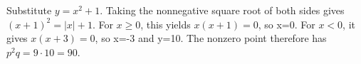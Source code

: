 Substitute $y=x^2+1$. Taking the nonnegative square root of both sides gives $(x+1)^2=|x|+1$. For $x\ge0$, this yields $x(x+1)=0$, so x=0. For $x<0$, it gives $x(x+3)=0$, so x=-3 and y=10. The nonzero point therefore has $p^2q=9\cdot10=\boxed{90}$.
